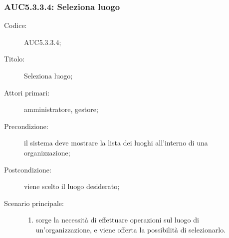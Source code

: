 \subsubsection{AUC5.3.3.4: Seleziona luogo}%
\label{subs:AUC5.3.3.4}
\begin{description}
  \item[Codice:] AUC5.3.3.4;
  \item[Titolo:] Seleziona luogo;
  \item[Attori primari:] amministratore, gestore;
  \item[Precondizione:] il sistema deve mostrare la lista dei luoghi all'interno di una organizzazione;
  \item[Postcondizione:] viene scelto il luogo desiderato;
  \item[Scenario principale:]
  \begin{enumerate}
    \item sorge la necessità di effettuare operazioni sul luogo di un'organizzazione, e viene offerta la possibilità di selezionarlo.
  \end{enumerate}
\end{description}